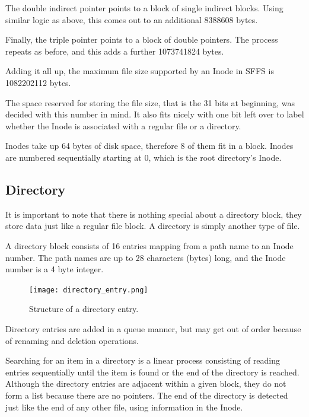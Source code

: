\documentclass[10pt,twocolumn]{article}
\begin{document}
  The double indirect pointer points to a block of single indirect blocks.
  Using similar logic as above, this comes out to an additional 8388608 bytes.

  Finally, the triple pointer points to a block of double pointers. The process
  repeats as before, and this adds a further 1073741824 bytes.

  Adding it all up, the maximum file size supported by an Inode in SFFS is
  1082202112 bytes.

  The space reserved for storing the file size, that is the 31 bits at
  beginning, was decided with this number in mind. It also fits nicely with
  one bit left over to label whether the Inode is associated with a regular 
  file or a directory.

  Inodes take up 64 bytes of disk space, therefore 8 of them fit in a block.
  Inodes are numbered sequentially starting at 0, which is the root directory's 
  Inode.

  \subsection{Directory}
  It is important to note that there is nothing special about a directory 
  block, they store data just like a regular file block. A directory is simply 
  another type of file.

  A directory block consists of 16 entries mapping from a path name to an Inode
  number. The path names are up to 28
  characters (bytes) long, and the Inode number is a 4 byte integer.

  \begin{figure}[h]
    \begin{center}
      \texttt{[image: directory\_entry.png]}
      \label{fig:directory_entry}
      \caption{Structure of a directory entry.}
    \end{center}
  \end{figure}

  Directory entries are added in a queue manner, but may get out of order
  because of renaming and deletion operations.

  Searching for an item in a directory is a linear process consisting of
  reading entries sequentially until the item is found or the end of
  the directory is reached. Although the directory entries are adjacent within
  a given block, they do not form a list because there are no pointers. The end
  of
  the directory is detected just like the end of any other file, using
  information in the Inode.
\end{document}
